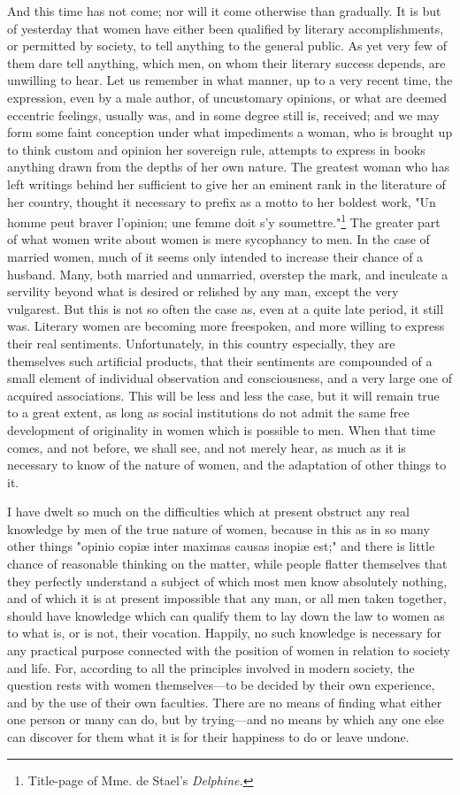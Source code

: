 \documentclass[12pt]{report}
\begin{document}
And this time has not come; nor will it come otherwise than gradually. It is but of yesterday that women have either been qualified by literary accomplishments, or permitted by society, to tell anything to the general public. As yet very few of them dare tell anything, which men, on whom their literary success depends, are unwilling to hear. Let us remember in what manner, up to a very recent time, the expression, even by a male author, of uncustomary opinions, or what are deemed eccentric feelings, usually was, and in some degree still is, received; and we may form some faint conception under what impediments a woman, who is brought up to think custom and opinion her sovereign rule, attempts to express in books anything drawn from the depths of her own nature. The greatest woman who has left writings behind her sufficient to give her an eminent rank in the literature of her country, thought it necessary to prefix as a motto to her boldest work, "Un homme peut braver l'opinion; une femme doit s'y soumettre."\footnote{Title-page of Mme. de Stael's \emph{Delphine.}} The greater part of what women write about women is mere sycophancy to men. In the case of married women, much of it seems only intended to increase their chance of a husband. Many, both married and unmarried, overstep the mark, and inculcate a servility beyond what is desired or relished by any man, except the very vulgarest. But this is not so often the case as, even at a quite late period, it still was. Literary women are becoming more freespoken, and more willing to express their real sentiments. Unfortunately, in this country especially, they are themselves such artificial products, that their sentiments are compounded of a small element of individual observation and consciousness, and a very large one of acquired associations. This will be less and less the case, but it will remain true to a great extent, as long as social institutions do not admit the same free development of originality in women which is possible to men. When that time comes, and not before, we shall see, and not merely hear, as much as it is necessary to know of the nature of women, and the adaptation of other things to it.

I have dwelt so much on the difficulties which at present obstruct any real knowledge by men of the true nature of women, because in this as in so many other things "opinio copiæ inter maximas causas inopiæ est;" and there is little chance of reasonable thinking on the matter, while people flatter themselves that they perfectly understand a subject of which most men know absolutely nothing, and of which it is at present impossible that any man, or all men taken together, should have knowledge which can qualify them to lay down the law to women as to what is, or is not, their vocation. Happily, no such knowledge is necessary for any practical purpose connected with the position of women in relation to society and life. For, according to all the principles involved in modern society, the question rests with women themselves—to be decided by their own experience, and by the use of their own faculties. There are no means of finding what either one person or many can do, but by trying—and no means by which any one else can discover for them what it is for their happiness to do or leave undone.
\end{document}
